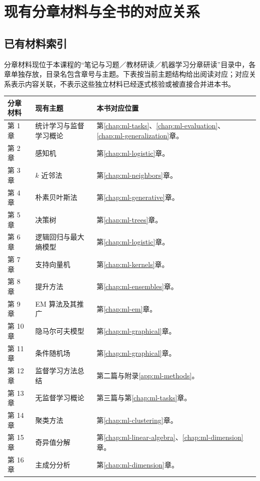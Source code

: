 \setcounter{chapter}{2} %
\chapter{现有分章材料与全书的对应关系}
\label{app:ml-materials}

\section{已有材料索引}

分章材料现位于本课程的“笔记与习题／教材研读／机器学习分章研读”目录中，各章单独存放，目录名包含章号与主题。下表按当前主题结构给出阅读对应；对应关系表示内容关联，不表示这些独立材料已经逐式核验或被直接合并进本书。
\begin{longtable}{@{}L{2.7cm}L{5.3cm}L{5.7cm}@{}}
  \toprule
  分章材料 & 现有主题 & 本书对应位置 \\
  \midrule
  \endhead
  第 1 章 & 统计学习与监督学习概论 & 第\ref{chap:ml-tasks}、\ref{chap:ml-evaluation}、\ref{chap:ml-generalization}章。\\
  第 2 章 & 感知机 & 第\ref{chap:ml-logistic}章。\\
  第 3 章 & $k$ 近邻法 & 第\ref{chap:ml-neighbors}章。\\
  第 4 章 & 朴素贝叶斯法 & 第\ref{chap:ml-generative}章。\\
  第 5 章 & 决策树 & 第\ref{chap:ml-trees}章。\\
  第 6 章 & 逻辑回归与最大熵模型 & 第\ref{chap:ml-logistic}章。\\
  第 7 章 & 支持向量机 & 第\ref{chap:ml-kernels}章。\\
  第 8 章 & 提升方法 & 第\ref{chap:ml-ensembles}章。\\
  第 9 章 & EM 算法及其推广 & 第\ref{chap:ml-em}章。\\
  第 10 章 & 隐马尔可夫模型 & 第\ref{chap:ml-graphical}章。\\
  第 11 章 & 条件随机场 & 第\ref{chap:ml-graphical}章。\\
  第 12 章 & 监督学习方法总结 & 第二篇与附录\ref{app:ml-methods}。\\
  第 13 章 & 无监督学习概论 & 第三篇与第\ref{chap:ml-tasks}章。\\
  第 14 章 & 聚类方法 & 第\ref{chap:ml-clustering}章。\\
  第 15 章 & 奇异值分解 & 第\ref{chap:ml-linear-algebra}、\ref{chap:ml-dimension}章。\\
  第 16 章 & 主成分分析 & 第\ref{chap:ml-dimension}章。\\

\end{longtable}
